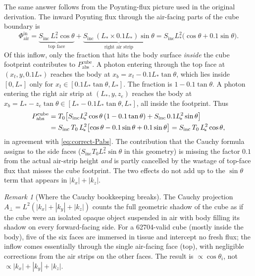 \documentclass[11pt,a4paper]{article}
\theoremstyle{definition}
\theoremstyle{remark}
\newtheorem{remark}[theorem]{Remark}
\newcommand{\Sinc}{S_{\mathrm{inc}}}
\newcommand{\Tzero}{T_0}
\newcommand{\Lact}{L_{\!*}}
\begin{document}
The same answer follows from the Poynting-flux picture used in the
original derivation. The inward Poynting flux through the air-facing
parts of the cube boundary is
\begin{equation}\label{eq:air-flux-correct}
  \Phi^{\mathrm{in}}_{\mathrm{air}}
  = \underbrace{\Sinc\,\Lact^2\cos\theta}_{\text{top face}}
  + \underbrace{\Sinc\,(\Lact\times 0.1\Lact)\sin\theta}_{\text{right air strip}}
  = \Sinc\Lact^2\bigl(\cos\theta + 0.1\sin\theta\bigr).
\end{equation}
Of this inflow, only the fraction that hits the body surface
\emph{inside} the cube footprint contributes to
$P_{\mathrm{abs}}^{\mathrm{cube}}$. A photon entering through the
top face at $(x_t,y,0.1\Lact)$ reaches the body at
$x_b = x_t-0.1\Lact\tan\theta$, which lies inside $[0,\Lact]$ only
for $x_t \in [0.1\Lact\tan\theta,\Lact]$. The fraction is
$1-0.1\tan\theta$. A photon entering the right air strip at
$(\Lact,y,z_e)$ reaches the body at
$x_b=\Lact-z_e\tan\theta\in[\Lact-0.1\Lact\tan\theta,\Lact]$,
all inside the footprint. Thus
\begin{align}
  P_{\mathrm{abs}}^{\mathrm{cube}}
  &= \Tzero\bigl[\Sinc\Lact^2\cos\theta\,(1-0.1\tan\theta)
     + \Sinc\,0.1\Lact^2\sin\theta\bigr] \notag\\
  &= \Sinc\,\Tzero\,\Lact^2\bigl[\cos\theta - 0.1\sin\theta + 0.1\sin\theta\bigr]
  = \Sinc\,\Tzero\,\Lact^2\cos\theta,
  \label{eq:flux-cancellation}
\end{align}
in agreement with \cref{eq:correct-Pabs}. The contribution that the
Cauchy formula assigns to the side faces ($\Sinc\Tzero\Lact^2\sin\theta$
in this geometry) is missing the factor $0.1$ from the actual air-strip
height \emph{and} is partly cancelled by the wastage of top-face flux
that misses the cube footprint. The two effects do not add up to the
$\sin\theta$ term that appears in $|k_x|+|k_z|$.

\begin{remark}[Where the Cauchy bookkeeping breaks]
The Cauchy projection $A_\perp=L^2(|k_x|+|k_y|+|k_z|)$ counts the
full geometric shadow of the cube as if the cube were an isolated
opaque object suspended in air with body filling its shadow on every
forward-facing side. For a 62704-valid cube (mostly inside the body),
five of the six faces are immersed in tissue and intercept no fresh
flux; the inflow comes essentially through the single air-facing
face (top), with negligible corrections from the air strips on the
other faces. The result is $\propto\cos\theta_i$, not
$\propto |k_x|+|k_y|+|k_z|$.
\end{remark}
\end{document}
